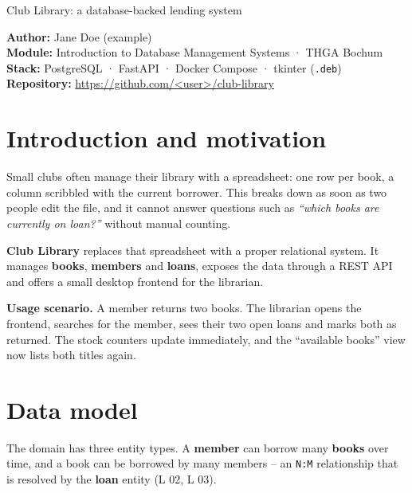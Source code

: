 \documentclass[11pt,a4paper]{article}
\begin{document}
\thispagestyle{empty}
%
{Club Library: a database-backed lending system}

\begin{infobox}
\textbf{Author:} Jane Doe (example) \\
\textbf{Module:} Introduction to Database Management Systems · THGA Bochum \\
\textbf{Stack:} PostgreSQL · FastAPI · Docker Compose · tkinter (\texttt{.deb}) \\
\textbf{Repository:} \url{https://github.com/<user>/club-library}
\end{infobox}

\tableofcontents
\vspace{1em}

\section{Introduction and motivation}

Small clubs often manage their library with a spreadsheet: one row per book, a
column scribbled with the current borrower. This breaks down as soon as two
people edit the file, and it cannot answer questions such as \emph{``which books
are currently on loan?''} without manual counting.

\textbf{Club Library} replaces that spreadsheet with a proper relational system.
It manages \textbf{books}, \textbf{members} and \textbf{loans}, exposes the data
through a REST API and offers a small desktop frontend for the librarian.

\begin{beispielbox}
\textbf{Usage scenario.} A member returns two books. The librarian opens the
frontend, searches for the member, sees their two open loans and marks both as
returned. The stock counters update immediately, and the ``available books''
view now lists both titles again.
\end{beispielbox}

\section{Data model}

The domain has three entity types. A \textbf{member} can borrow many
\textbf{books} over time, and a book can be borrowed by many members -- an
\texttt{N:M} relationship that is resolved by the \textbf{loan} entity (L 02,
L 03).
\end{document}
